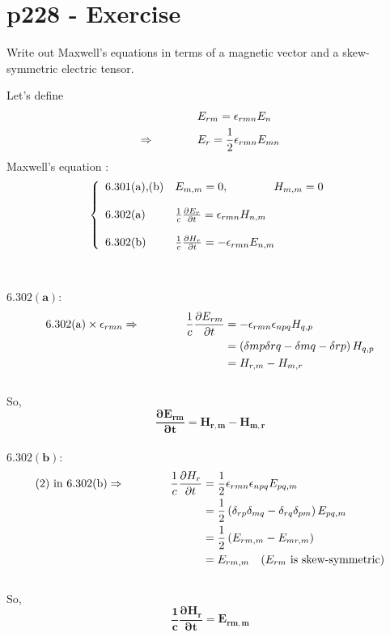 \section{p228 - Exercise}
\begin{tcolorbox}
Write out Maxwell's equations in terms of a magnetic vector and a skew-symmetric electric tensor.
\end{tcolorbox}
Let's  define 
\begin{align}
 &E_{rm}= \epsilon_{rmn}E_n\\
 \Rightarrow\quad\quad\quad\quad &E_r = \frac{1}{2} \epsilon_{rmn}E_{mn}
\end{align}
Maxwell's equation :
\begin{align}\left\{ \begin{array}{ll}
\text{6.301(a),(b)}&E_{m,m}=0,\quad\quad\quad\quad H_{m,m}=0\\\\
\text{6.302(a)}&\frac{1}{c}\frac{\partial E_r}{\partial t}= \epsilon_{rmn}H_{n,m}\\\\
\text{6.302(b)}&\frac{1}{c}\frac{\partial H_r}{\partial t}= -\epsilon_{rmn}E_{n,m}
\end{array}\right.
\end{align}\\\\
$\mathbf{6.302(a)}$:
\begin{align}
\text{6.302(a)}\times\epsilon_{rmn}\Rightarrow\quad\quad\quad\quad \frac{1}{c}\frac{\partial E_{rm}}{\partial t}&= -\epsilon_{rmn}\epsilon_{npq}H_{q,p}\\
&= \left(\delta{mp}\delta{rq}-\delta{mq}-\delta{rp}\right)H_{q,p}\\
&= H_{r,m}-H_{m,r}
\end{align}\\
So,
$$\mathbf{\frac{\partial E_{rm}}{\partial t}=H_{r,m}-H_{m,r}}$$\\
$\mathbf{6.302(b)}$:\\
\begin{align}
\text{(2) in 6.302(b)}\Rightarrow\quad\quad\quad\quad \frac{1}{c}\frac{\partial H_r}{\partial t}&= \frac{1}{2} \epsilon_{rmn}\epsilon_{npq}E_{pq,m}\\
&= \frac{1}{2} \left( \delta_{rp}\delta_{mq}-\delta_{rq}\delta_{pm}\right)E_{pq,m}\\
&= \frac{1}{2} \left( E_{rm,m} -E_{mr,m}\right)\\
&= E_{rm,m} \quad\text{(}E_{rm}\text{ is skew-symmetric)}
\end{align}\\
So,
$$\mathbf{\frac{1}{c}\frac{\partial H_r}{\partial t}= E_{rm,m}}$$\\
